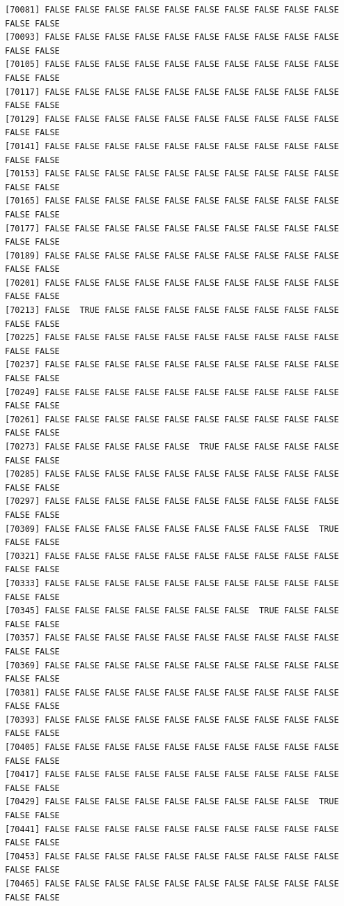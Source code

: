\documentclass[
  a4paper,
  DIV=11,
  numbers=noendperiod]{scrartcl}
\begin{document}
\begin{verbatim}
[70081] FALSE FALSE FALSE FALSE FALSE FALSE FALSE FALSE FALSE FALSE FALSE FALSE
[70093] FALSE FALSE FALSE FALSE FALSE FALSE FALSE FALSE FALSE FALSE FALSE FALSE
[70105] FALSE FALSE FALSE FALSE FALSE FALSE FALSE FALSE FALSE FALSE FALSE FALSE
[70117] FALSE FALSE FALSE FALSE FALSE FALSE FALSE FALSE FALSE FALSE FALSE FALSE
[70129] FALSE FALSE FALSE FALSE FALSE FALSE FALSE FALSE FALSE FALSE FALSE FALSE
[70141] FALSE FALSE FALSE FALSE FALSE FALSE FALSE FALSE FALSE FALSE FALSE FALSE
[70153] FALSE FALSE FALSE FALSE FALSE FALSE FALSE FALSE FALSE FALSE FALSE FALSE
[70165] FALSE FALSE FALSE FALSE FALSE FALSE FALSE FALSE FALSE FALSE FALSE FALSE
[70177] FALSE FALSE FALSE FALSE FALSE FALSE FALSE FALSE FALSE FALSE FALSE FALSE
[70189] FALSE FALSE FALSE FALSE FALSE FALSE FALSE FALSE FALSE FALSE FALSE FALSE
[70201] FALSE FALSE FALSE FALSE FALSE FALSE FALSE FALSE FALSE FALSE FALSE FALSE
[70213] FALSE  TRUE FALSE FALSE FALSE FALSE FALSE FALSE FALSE FALSE FALSE FALSE
[70225] FALSE FALSE FALSE FALSE FALSE FALSE FALSE FALSE FALSE FALSE FALSE FALSE
[70237] FALSE FALSE FALSE FALSE FALSE FALSE FALSE FALSE FALSE FALSE FALSE FALSE
[70249] FALSE FALSE FALSE FALSE FALSE FALSE FALSE FALSE FALSE FALSE FALSE FALSE
[70261] FALSE FALSE FALSE FALSE FALSE FALSE FALSE FALSE FALSE FALSE FALSE FALSE
[70273] FALSE FALSE FALSE FALSE FALSE  TRUE FALSE FALSE FALSE FALSE FALSE FALSE
[70285] FALSE FALSE FALSE FALSE FALSE FALSE FALSE FALSE FALSE FALSE FALSE FALSE
[70297] FALSE FALSE FALSE FALSE FALSE FALSE FALSE FALSE FALSE FALSE FALSE FALSE
[70309] FALSE FALSE FALSE FALSE FALSE FALSE FALSE FALSE FALSE  TRUE FALSE FALSE
[70321] FALSE FALSE FALSE FALSE FALSE FALSE FALSE FALSE FALSE FALSE FALSE FALSE
[70333] FALSE FALSE FALSE FALSE FALSE FALSE FALSE FALSE FALSE FALSE FALSE FALSE
[70345] FALSE FALSE FALSE FALSE FALSE FALSE FALSE  TRUE FALSE FALSE FALSE FALSE
[70357] FALSE FALSE FALSE FALSE FALSE FALSE FALSE FALSE FALSE FALSE FALSE FALSE
[70369] FALSE FALSE FALSE FALSE FALSE FALSE FALSE FALSE FALSE FALSE FALSE FALSE
[70381] FALSE FALSE FALSE FALSE FALSE FALSE FALSE FALSE FALSE FALSE FALSE FALSE
[70393] FALSE FALSE FALSE FALSE FALSE FALSE FALSE FALSE FALSE FALSE FALSE FALSE
[70405] FALSE FALSE FALSE FALSE FALSE FALSE FALSE FALSE FALSE FALSE FALSE FALSE
[70417] FALSE FALSE FALSE FALSE FALSE FALSE FALSE FALSE FALSE FALSE FALSE FALSE
[70429] FALSE FALSE FALSE FALSE FALSE FALSE FALSE FALSE FALSE  TRUE FALSE FALSE
[70441] FALSE FALSE FALSE FALSE FALSE FALSE FALSE FALSE FALSE FALSE FALSE FALSE
[70453] FALSE FALSE FALSE FALSE FALSE FALSE FALSE FALSE FALSE FALSE FALSE FALSE
[70465] FALSE FALSE FALSE FALSE FALSE FALSE FALSE FALSE FALSE FALSE FALSE FALSE

\end{verbatim}
\end{document}
